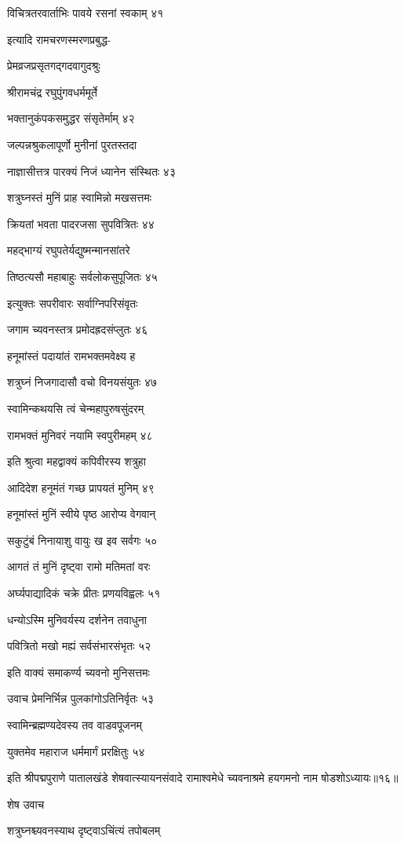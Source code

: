 विचित्रतरवार्ताभिः पावये रसनां स्वकाम् ४१

इत्यादि रामचरणस्मरणप्रबुद्ध-

प्रेमव्रजप्रसृतगद्गदवागुदश्रुः

श्रीरामचंद्र रघुपुंगवधर्ममूर्ते

भक्तानुकंपकसमुद्धर संसृतेर्माम् ४२

जल्पन्नश्रुकलापूर्णो मुनीनां पुरतस्तदा

नाज्ञासीत्तत्र पारक्यं निजं ध्यानेन संस्थितः ४३

शत्रुघ्नस्तं मुनिं प्राह स्वामिन्नो मखसत्तमः

क्रियतां भवता पादरजसा सुपवित्रितः ४४

महद्भाग्यं रघुपतेर्यद्युष्मन्मानसांतरे

तिष्ठत्यसौ महाबाहुः सर्वलोकसुपूजितः ४५

इत्युक्तः सपरीवारः सर्वाग्निपरिसंवृतः

जगाम च्यवनस्तत्र प्रमोदह्रदसंप्लुतः ४६

हनूमांस्तं पदायांतं रामभक्तमवेक्ष्य ह

शत्रुघ्नं निजगादासौ वचो विनयसंयुतः ४७

स्वामिन्कथयसि त्वं चेन्महापुरुषसुंदरम्

रामभक्तं मुनिवरं नयामि स्वपुरीमहम् ४८

इति श्रुत्वा महद्वाक्यं कपिवीरस्य शत्रुहा

आदिदेश हनूमंतं गच्छ प्रापयतं मुनिम् ४९

हनूमांस्तं मुनिं स्वीये पृष्ठ आरोप्य वेगवान्

सकुटुंबं निनायाशु वायुः ख इव सर्वगः ५०

आगतं तं मुनिं दृष्ट्वा रामो मतिमतां वरः

अर्घ्यपाद्यादिकं चक्रे प्रीतः प्रणयविह्वलः ५१

धन्योऽस्मि मुनिवर्यस्य दर्शनेन तवाधुना

पवित्रितो मखो मह्यं सर्वसंभारसंभृतः ५२

इति वाक्यं समाकर्ण्य च्यवनो मुनिसत्तमः

उवाच प्रेमनिर्भिन्न पुलकांगोऽतिनिर्वृतः ५३

स्वामिन्ब्रह्मण्यदेवस्य तव वाडवपूजनम्

युक्तमेव महाराज धर्ममार्गं प्ररक्षितुः ५४

इति श्रीपद्मपुराणे पातालखंडे शेषवात्स्यायनसंवादे रामाश्वमेधे च्यवनाश्रमे हयगमनो नाम षोडशोऽध्यायः॥१६॥


शेष उवाच

शत्रुघ्नश्च्यवनस्याथ दृष्ट्वाऽचिंत्यं तपोबलम्

